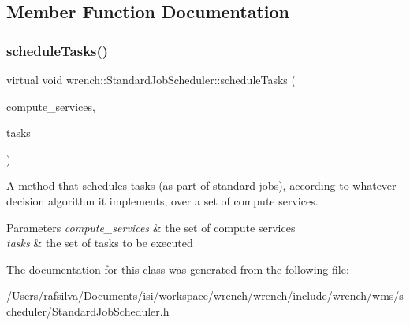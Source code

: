 \subsection{Member Function Documentation}
\mbox{\label{classwrench_1_1_standard_job_scheduler_a1ef07acfece4706f7f172c740a8015c3}} 
\subsubsection{\texorpdfstring{schedule\+Tasks()}{scheduleTasks()}}
{\footnotesize\ttfamily virtual void wrench\+::\+Standard\+Job\+Scheduler\+::schedule\+Tasks (\begin{DoxyParamCaption}\item[{const std\+::set$<$ \hyperlink{classwrench_1_1_compute_service}{Compute\+Service} $\ast$$>$ \&}]{compute\+\_\+services,  }\item[{const std\+::vector$<$ \hyperlink{classwrench_1_1_workflow_task}{Workflow\+Task} $\ast$$>$ \&}]{tasks }\end{DoxyParamCaption})\hspace{0.3cm}{\ttfamily [pure virtual]}}



A method that schedules tasks (as part of standard jobs), according to whatever decision algorithm it implements, over a set of compute services. 


\begin{DoxyParams}{Parameters}
{\em compute\+\_\+services} & the set of compute services \\
\hline
{\em tasks} & the set of tasks to be executed \\
\hline
\end{DoxyParams}


The documentation for this class was generated from the following file\+:\begin{DoxyCompactItemize}
\item 
/\+Users/rafsilva/\+Documents/isi/workspace/wrench/wrench/include/wrench/wms/scheduler/Standard\+Job\+Scheduler.\+h\end{DoxyCompactItemize}
